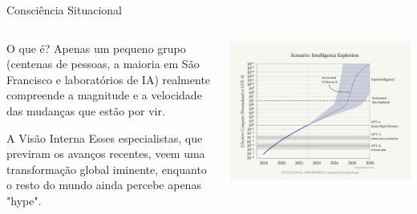 \documentclass[aspectratio=169,12pt]{beamer}
\begin{document}
\begin{frame}{Consciência Situacional}
    \begin{columns}
        \begin{column}{0.5\textwidth}
            \begin{block}{O que é?}
                Apenas um pequeno grupo (centenas de pessoas, a maioria em São Francisco e laboratórios de IA) realmente compreende a magnitude e a velocidade das mudanças que estão por vir.
            \end{block}
            \begin{exampleblock}{A Visão Interna}
                Esses especialistas, que previram os avanços recentes, veem uma transformação global iminente, enquanto o resto do mundo ainda percebe apenas "hype".
            \end{exampleblock}
        \end{column}
        \begin{column}{0.5\textwidth}
            \centering
            \includegraphics[width=\textwidth]{output/image-044.png}
        \end{column}
    \end{columns}
\end{frame}
\end{document}
